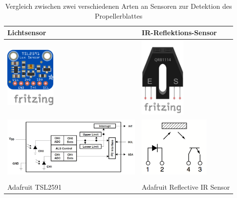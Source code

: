 \begin{table}[h]
	\centering
	\begin{tabularx}{0.95\textwidth}{M|M}

		Lichtsensor & IR-Reflektions-Sensor \\
		\hline
		\includegraphics[height=3cm]{images/chapter/03/sensor_tsl2591.jpg}  & \includegraphics[height=4cm]{images/chapter/03/sensor_ir.jpg}  \\
		\includegraphics[height=3cm]{images/chapter/03/sensor_tsl2591_schema.png} & \includegraphics[height=3cm]{images/chapter/03/sensor_ir_schema.png} \\
		\cite[S.2]{tsl2591_datasheet} & \cite[S.1]{ir_datasheet} \\
		Adafruit TSL2591 & Adafruit Reflective IR Sensor \newline \\
	\end{tabularx}
	\caption{Vergleich zwischen zwei verschiedenen Arten an Sensoren zur Detektion des Propellerblattes}
\end{table}

